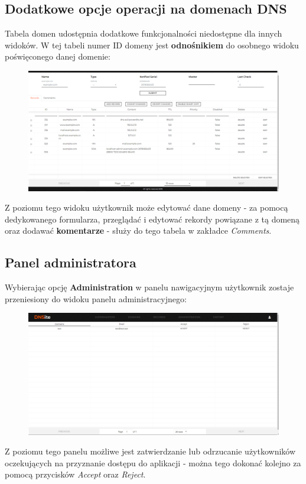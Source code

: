 \documentclass[12pt] {article}
\begin{document}
\subsection{Dodatkowe opcje operacji na domenach DNS}
Tabela domen udostępnia dodatkowe funkcjonalności niedostępne dla innych widoków. W tej tabeli numer ID domeny jest \textbf{odnośnikiem} do osobnego widoku poświęconego danej domenie:
\begin{figure}[H]
\centering
\includegraphics[width=\textwidth]{res/16_widok_domeny}
\end{figure}
Z poziomu tego widoku użytkownik może edytować dane domeny - za pomocą dedykowanego formularza, przeglądać i edytować rekordy powiązane z tą domeną oraz dodawać \textbf{komentarze} - służy do tego tabela w zakładce \emph{Comments}.


\subsection{Panel administratora}
Wybierając opcję \textbf{Administration} w panelu nawigacyjnym użytkownik zostaje przeniesiony do widoku panelu administracyjnego:
\begin{figure}[H]
\centering
\includegraphics[width=\textwidth]{res/17_panel_administracyjny}
\end{figure}
Z poziomu tego panelu możliwe jest zatwierdzanie lub odrzucanie użytkowników oczekujących na przyznanie dostępu do aplikacji - można tego dokonać kolejno za pomocą przycisków \emph{Accept} oraz \emph{Reject}.
\end{document}
